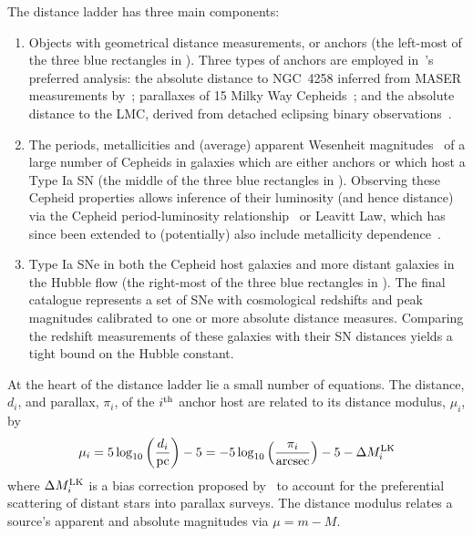 \documentclass[a4paper,fleqn,usenatbib]{mnras}
\newcommand{\riess}{\citetalias{Riess_etal:2016}}
\newcommand{\dMLK}{\ensuremath{\Delta M_i^{\rm LK}}}
\begin{document}
{The distance ladder has three main components:
\begin{enumerate}
\item
Objects with geometrical distance measurements, or anchors (the left-most of the three blue rectangles in ). Three types of anchors are employed in~\riess's preferred analysis: the absolute distance to NGC~4258 inferred from MASER
measurements by~\cite{Humphreys_etal:2013}; parallaxes of 15 Milky Way Cepheids~\citep{vanLeeuwen_etal:2007,Riess_etal:2014,Casertano_etal:2015}; and the absolute distance to the LMC, derived from detached eclipsing binary observations~\citep{Pietrzynski_etal:2013}.
\item
The periods, metallicities and (average) apparent Wesenheit magnitudes~\citep{Madore:1982} of a large number of Cepheids in galaxies which are either anchors or which host a Type Ia SN (the middle of the three blue rectangles in ). Observing these Cepheid properties allows inference of their luminosity (and hence distance) via the Cepheid period-luminosity relationship~\citep{Leavitt:1908,Leavitt_Pickering:1912} or Leavitt Law, which has since been extended to (potentially) also include metallicity dependence~\citep{Freedman_Madore:2011}.

\item
Type Ia SNe in both the Cepheid host galaxies and more distant galaxies in the Hubble flow (the right-most of the three blue rectangles in ). The final catalogue represents a set of SNe with cosmological redshifts and peak magnitudes calibrated to one or more absolute distance measures. Comparing the redshift measurements of these galaxies with their SN distances yields a tight bound on the Hubble constant.
\end{enumerate}

At the heart of the distance ladder lie a small number of equations. The distance, $d_i$, and parallax, $\pi_i$, of the $i^{\rm th}$ anchor host are related to its distance modulus, $\mu_i$, by
\begin{equation}
\mu_i= 5 \log_{10}{\left( \frac{d_i}{\rm pc} \right)} - 5 = -5 \log_{10}{\left( \frac{\pi_i}{\rm arcsec} \right)} - 5 - \dMLK \label{equation:anchor}
\end{equation}
where $\dMLK$ is a bias correction proposed by~\citet{Lutz_Kelker_1973} to account for the preferential scattering of distant stars into parallax surveys. The distance modulus relates a source's apparent and absolute magnitudes via $\mu = m - M$.

}
\end{document}
